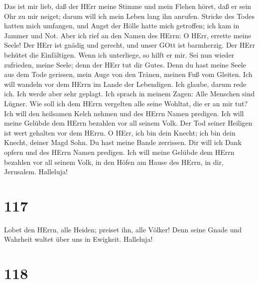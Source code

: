  Das ist mir lieb, daß der HErr meine Stimme und mein Flehen
höret,  daß er sein Ohr zu mir neiget; darum will ich mein
Leben lang ihn anrufen.  Stricke des Todes hatten mich
umfangen, und Angst der Hölle hatte mich getroffen; ich kam in Jammer
und Not.  Aber ich rief an den Namen des HErrn: O HErr,
errette meine Seele!  Der HErr ist gnädig und gerecht, und
unser GOtt ist barmherzig.  Der HErr behütet die
Einfältigen. Wenn ich unterliege, so hilft er mir.  Sei nun
wieder zufrieden, meine Seele; denn der HErr tut dir Gutes. 
Denn du hast meine Seele aus dem Tode gerissen, mein Auge von den
Tränen, meinen Fuß vom Gleiten.  Ich will wandeln vor dem
HErrn im Lande der Lebendigen.  Ich glaube, darum rede ich.
Ich werde aber sehr geplagt.  Ich sprach in meinem Zagen:
Alle Menschen sind Lügner.  Wie soll ich dem HErrn
vergelten alle seine Wohltat, die er an mir tut?  Ich will
den heilsamen Kelch nehmen und des HErrn Namen predigen. 
Ich will meine Gelübde dem HErrn bezahlen vor all seinem Volk.
 Der Tod seiner Heiligen ist wert gehalten vor dem HErrn.
 O HErr, ich bin dein Knecht; ich bin dein Knecht, deiner
Magd Sohn. Du hast meine Bande zerrissen.  Dir will ich
Dank opfern und des HErrn Namen predigen.  Ich will meine
Gelübde dem HErrn bezahlen vor all seinem Volk,  in den
Höfen am Hause des HErrn, in dir, Jerusalem. Halleluja!

\hypertarget{section-116}{%
\section{117}\label{section-116}}

 Lobet den HErrn, alle Heiden; preiset ihn, alle Völker!
 Denn seine Gnade und Wahrheit waltet über uns in Ewigkeit.
Halleluja!

\hypertarget{section-117}{%
\section{118}\label{section-117}}

